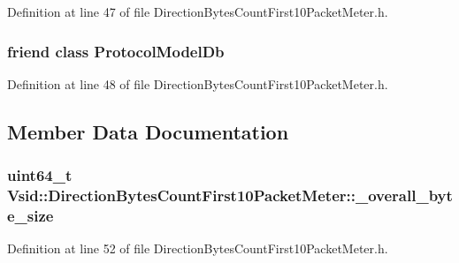 Definition at line 47 of file Direction\-Bytes\-Count\-First10\-Packet\-Meter.\-h.

\hypertarget{class_vsid_1_1_direction_bytes_count_first10_packet_meter_a3c0d389e7a9476b06313d8fb9ca9fe68}{
\subsubsection[{Protocol\-Model\-Db}]{\setlength{\rightskip}{0pt plus 5cm}friend class {\bf Protocol\-Model\-Db}\hspace{0.3cm}{\ttfamily [friend]}}}\label{class_vsid_1_1_direction_bytes_count_first10_packet_meter_a3c0d389e7a9476b06313d8fb9ca9fe68}


Definition at line 48 of file Direction\-Bytes\-Count\-First10\-Packet\-Meter.\-h.



\subsection{Member Data Documentation}
\hypertarget{class_vsid_1_1_direction_bytes_count_first10_packet_meter_a38e8da3cb56886292cc89ed2911decce}{
\subsubsection[{\-\_\-overall\-\_\-byte\-\_\-size}]{\setlength{\rightskip}{0pt plus 5cm}uint64\-\_\-t Vsid\-::\-Direction\-Bytes\-Count\-First10\-Packet\-Meter\-::\-\_\-overall\-\_\-byte\-\_\-size\hspace{0.3cm}{\ttfamily [protected]}}}\label{class_vsid_1_1_direction_bytes_count_first10_packet_meter_a38e8da3cb56886292cc89ed2911decce}


Definition at line 52 of file Direction\-Bytes\-Count\-First10\-Packet\-Meter.\-h.

